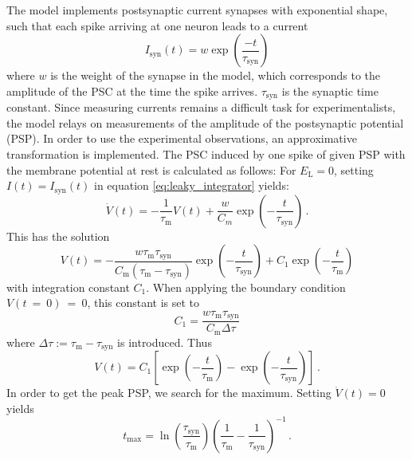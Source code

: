 The model implements  
postsynaptic current synapses with exponential shape, such that each 
spike arriving at one neuron leads to a current 
\begin{equation}
I_{\text{syn}}(t) = w \exp{\left(\frac{-t}{\tau_\text{syn}}\right)}	
    \label{eq:synaptic_current}
\end{equation}
where $w$ is the weight of the synapse in the model,
which corresponds to the amplitude of the PSC
at the time the spike arrives. 
$\tau_\text{syn}$ is the synaptic time constant.
Since measuring currents remains a difficult task for experimentalists, 
the model relays on measurements of the amplitude of the postsynaptic 
potential (PSP). In order to use the experimental observations,
an approximative transformation is implemented.
The PSC induced by one spike of given PSP with the membrane potential
at rest is calculated as follows:
For $E_\text{L} = 0$, setting $I(t) = I_\text{syn}(t)$ in equation \eqref{eq:leaky_integrator}
yields:
\begin{equation}
    \dot{V}(t)
    = - \frac{1}{\tau_\text{m}} V(t) + \frac{w}{C_m} \exp{\left(-\frac{t}{\tau_\text{syn}}\right)} \,.
    \label{eq:psc_ode}
\end{equation}
This has the solution 
\begin{equation}
    V(t) =   
        - \frac{w \tau_\text{m} \tau_\text{syn}} {C_\text{m} \left(\tau_\text{m} - \tau_\text{syn}\right)}	
        \exp{\left( -\frac{t}{\tau_\text{syn}} \right)} 
        + C_1 \exp{\left(-\frac{t}{\tau_\text{m}} \right)}
    \label{eq:psc_ode_sol}
\end{equation}
with integration constant $C_1$.
When applying the boundary condition $V(t~=~0)~=~0$, this constant is set to
\begin{equation}
    C_1 = \frac{w \tau_\text{m} \tau_\text{syn}}{C_\text{m} \Delta\tau}	
    \label{eq:C_1}
\end{equation}
where $\Delta\tau := \tau_\text{m} - \tau_\text{syn}$ is introduced.
Thus
\begin{equation}
    V(t) = C_1 \left[\exp\left(-\frac{t}{\tau_\text{m}}\right) - \exp\left(-\frac{t}{\tau_\text{syn}}\right)\right]	\,.  
    \label{eq:V(t)}
\end{equation}
In order to get the peak PSP, we search for the maximum. Setting $\dot{V}(t) = 0$ 
yields
\begin{equation}
    t_\text{max} 
        = \ln{\!\left(\frac{\tau_\text{syn}}{\tau_\text{m}}\right)} 
            \left(\frac{1}{\tau_\text{m}} - \frac{1}{\tau_\text{syn}}\right)^{-1} \,.
    \label{eq:t_max}
\end{equation}
